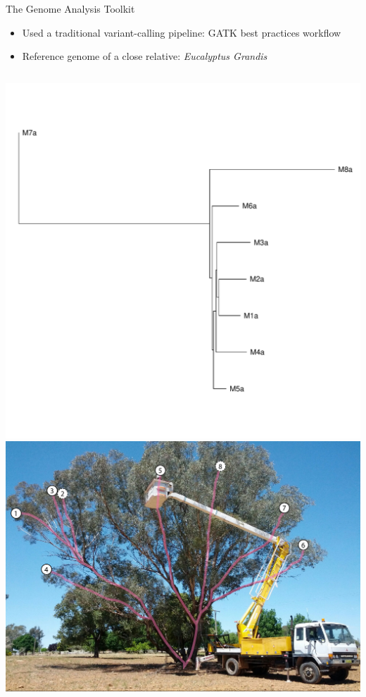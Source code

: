 \documentclass{beamer}
\begin{document}
\begin{frame}{The Genome Analysis Toolkit}
	\begin{itemize}
	\item Used a traditional variant-calling pipeline: GATK best practices workflow
	\item Reference genome of a close relative: \textit{Eucalyptus Grandis}
	\end{itemize}
	\begin{columns}
		\includegraphics[width=\linewidth]{figures/gatk_tree.pdf}
		\includegraphics[width=\linewidth]{figures/labeled_tree.jpg}
	\end{columns}
\end{frame}
\end{document}
